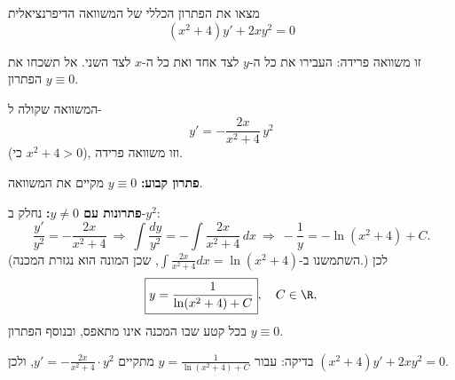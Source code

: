 
\begin{question}
מצאו את הפתרון הכללי של המשוואה הדיפרנציאלית
\[ (x^2+4)y'+2xy^2=0 \]
\end{question}

\begin{hint}
זו משוואה פרידה: העבירו את כל ה-$y$ לצד אחד ואת כל ה-$x$ לצד השני. אל תשכחו את הפתרון $y\equiv0$.
\end{hint}

\begin{solution}
המשוואה שקולה ל-
\[ y'=-\frac{2x}{x^2+4}\,y^2 \]
(כי $x^2+4>0$), וזו משוואה פרידה.

\textbf{פתרון קבוע:} $y\equiv0$ מקיים את המשוואה.

\textbf{פתרונות עם $y\neq0$:} נחלק ב-$y^2$:
\[ \frac{y'}{y^2}=-\frac{2x}{x^2+4}\ \Longrightarrow\ \int\frac{dy}{y^2}=-\int\frac{2x}{x^2+4}\,dx \ \Longrightarrow\ -\frac1y=-\ln(x^2+4)+C. \]
(השתמשנו ב-$\int\frac{2x}{x^2+4}dx=\ln(x^2+4)$, שכן המונה הוא נגזרת המכנה.) לכן
\[ \boxed{y=\frac{1}{\ln(x^2+4)+C}},\quad C\in\R, \]
בכל קטע שבו המכנה אינו מתאפס, ובנוסף הפתרון $\boxed{y\equiv0}$.

בדיקה: עבור $y=\frac1{\ln(x^2+4)+C}$ מתקיים $y'=-\frac{2x}{x^2+4}\cdot y^2$, ולכן $(x^2+4)y'+2xy^2=0$.
\end{solution}
